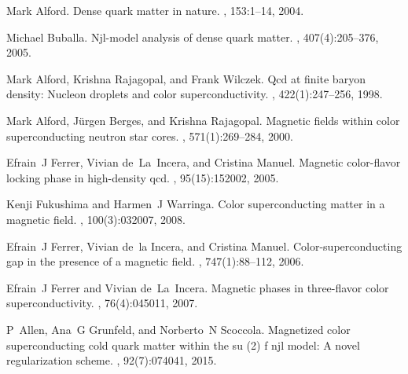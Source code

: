 \documentclass[12pt]{article}
\begin{document}
\begin{thebibliography}{99}

%

Mark Alford.
\newblock Dense quark matter in nature.
, 153:1--14, 2004.

Michael Buballa.
\newblock Njl-model analysis of dense quark matter.
, 407(4):205--376, 2005.

Mark Alford, Krishna Rajagopal, and Frank Wilczek.
\newblock Qcd at finite baryon density: Nucleon droplets and color
  superconductivity.
, 422(1):247--256, 1998.

Mark Alford, J{\"u}rgen Berges, and Krishna Rajagopal.
\newblock Magnetic fields within color superconducting neutron star cores.
, 571(1):269--284, 2000.

Efrain~J Ferrer, Vivian de~La~Incera, and Cristina Manuel.
\newblock Magnetic color-flavor locking phase in high-density qcd.
, 95(15):152002, 2005.

Kenji Fukushima and Harmen~J Warringa.
\newblock Color superconducting matter in a magnetic field.
, 100(3):032007, 2008.

Efrain~J Ferrer, Vivian de~la Incera, and Cristina Manuel.
\newblock Color-superconducting gap in the presence of a magnetic field.
, 747(1):88--112, 2006.

Efrain~J Ferrer and Vivian de~La~Incera.
\newblock Magnetic phases in three-flavor color superconductivity.
, 76(4):045011, 2007.

P~Allen, Ana~G Grunfeld, and Norberto~N Scoccola.
\newblock Magnetized color superconducting cold quark matter within the su (2)
  f njl model: A novel regularization scheme.
, 92(7):074041, 2015.


\end{thebibliography}
\end{document}
